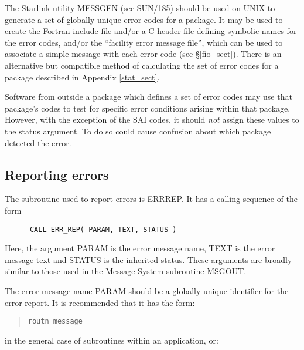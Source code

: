 \documentclass[twoside,11pt]{article}
\newcommand{\htmlref}[2]{#1}
\newcommand{\latex}[1]{#1}
\newcommand{\xref}[3]{#1}
\newcommand{\xlabel}[1]{}
\renewcommand{\_}{\texttt{\symbol{95}}}
\begin{document}
The Starlink utility
\xref{MESSGEN}{sun185}{} \latex{ (see SUN/185)} 
should be used on UNIX to generate 
a set of globally unique error codes for a package. It may be used to create
the Fortran include file and/or a C header file defining symbolic names
for the error codes, and/or the ``facility error message file'', which
can be used to 
\htmlref{associate a simple message}{fio_sect}
with each error code\latex{ (see \S\ref{fio_sect})}.
There is 
\htmlref{an alternative}{stat_sect}
but compatible method of calculating the set of error codes for a 
package\latex{ described in Appendix \ref{stat_sect}}.

Software from outside a package which defines a set of error codes may
use that package's codes to test for specific error conditions arising within
that package.
However, with the exception of the SAI\_\_ codes, it should \emph{not} assign
these values to the status argument.
To do so could cause confusion about which package detected the error. 

\subsection{\xlabel{reporting_errors}Reporting errors \label{report_sect}}

The subroutine used to report errors is ERR\_REP. 
It has a calling sequence of the form

\begin {small}
\begin{verbatim}
      CALL ERR_REP( PARAM, TEXT, STATUS )
\end{verbatim}
\end {small}

Here, the argument PARAM is the error message name, TEXT is the error message
text and STATUS is the inherited status.
These arguments are broadly similar to those used in the Message System
subroutine MSG\_OUT. 

The error message name PARAM should be a globally unique identifier for the
error report.
It is recommended that it has the form:

\begin {quote}
\begin {small}
\begin{verbatim}
routn_message
\end{verbatim}
\end {small}
\end {quote}

in the general case of subroutines within an application, or:
\end{document}
